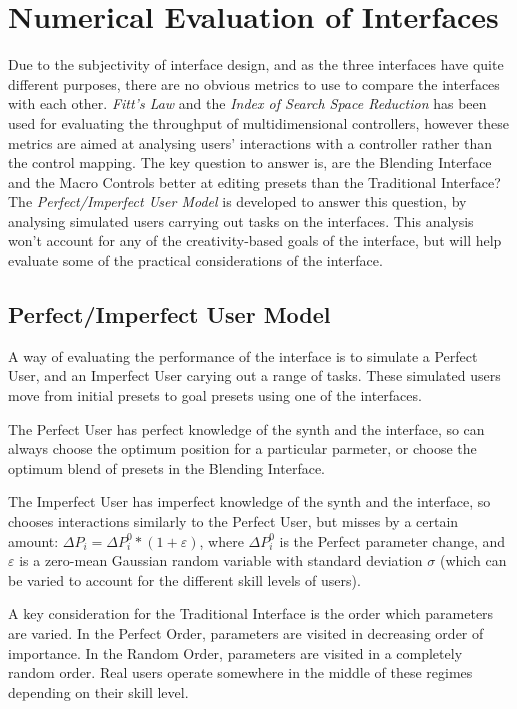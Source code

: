 \documentclass[11pt, oneside]{report}   	%
\begin{document}
\chapter{Numerical Evaluation of Interfaces}
Due to the subjectivity of interface design, and as the three interfaces have quite different purposes, there are no obvious metrics to use to compare the interfaces with each other. 
\emph{Fitt's Law} and the \emph{Index of Search Space Reduction} \cite{TubbThesis} has been used for evaluating the throughput of multidimensional controllers, however these metrics are aimed at analysing users' interactions with a controller rather than the control mapping. 
The key question to answer is, are the Blending Interface and the Macro Controls better at editing presets than the Traditional Interface?
The \emph{Perfect/Imperfect User Model}  is developed to answer this question, by analysing simulated users carrying out tasks on the interfaces. This analysis won't account for any of the creativity-based goals of the interface, but will help evaluate some of the practical considerations of the interface. 
\section{Perfect/Imperfect User Model}\label{sec:PerfectImperfect}
A way of evaluating the performance of the interface is to simulate a Perfect User, and an Imperfect User carying out a range of tasks. These simulated users move from initial presets to goal presets using one of the interfaces. 
 
The Perfect User has perfect knowledge of the synth and the interface, so can always choose the optimum position for a particular parmeter, or choose the optimum blend of presets in the Blending Interface.

The Imperfect User has imperfect knowledge of the synth and the interface, so chooses interactions similarly to the Perfect User, but misses by a certain amount: $\Delta P_i = \Delta P_i^0 * (1 + \varepsilon)$, where $\Delta P_i^0$ is the Perfect parameter change, and $\varepsilon$ is a zero-mean Gaussian random variable with standard deviation $\sigma$ (which can be varied to account for the different skill levels of users).

A key consideration for the Traditional Interface is the order which parameters are varied. In the Perfect Order, parameters are visited in decreasing order of importance. In the Random Order, parameters are visited in a completely random order. Real users operate somewhere in the middle of these regimes depending on their skill level. 
\vspace{-10pt}
\end{document}
